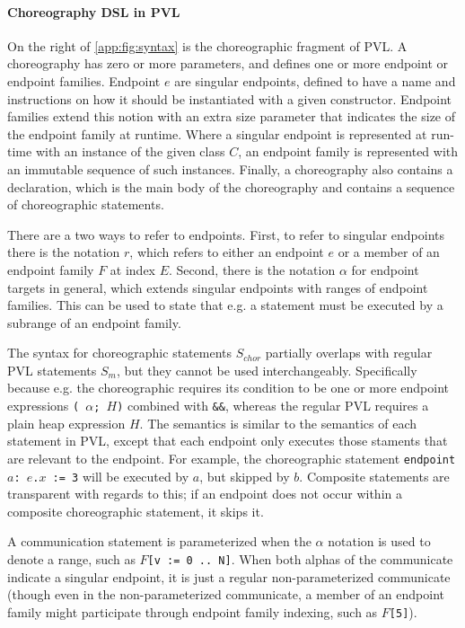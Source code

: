 \paragraph{Choreography DSL in PVL} On the right of \cref{app:fig:syntax} is the choreographic fragment of PVL. A choreography has zero or more parameters, and defines one or more endpoint or endpoint families. Endpoint $e$ are singular endpoints, defined to have a name and instructions on how it should be instantiated with a given constructor. Endpoint families extend this notion with an extra size parameter that indicates the size of the endpoint family at runtime. Where a singular endpoint is represented at run-time with an instance of the given class $C$, an endpoint family is represented with an immutable sequence of such instances. Finally, a choreography also contains a \kwrun{} declaration, which is the main body of the choreography and contains a sequence of choreographic statements.

There are a two ways to refer to endpoints. First, to refer to singular endpoints there is the notation $r$, which refers to either an endpoint $e$ or a member of an endpoint family $F$ at index $E$. Second, there is the notation $\alpha$ for endpoint targets in general, which extends singular endpoints with ranges of endpoint families. This can be used to state that e.g. a statement must be executed by a subrange of an endpoint family.

The syntax for choreographic statements $S_{chor}$ partially overlaps with regular PVL statements $S_m$, but they cannot be used interchangeably. Specifically because e.g. the choreographic \kwif{} requires its condition to be one or more endpoint expressions \texttt{(\kwepexpr{} $\alpha$; $H$)} combined with \texttt{\&\&}, whereas the regular PVL \kwif{} requires a plain heap expression $H$. The semantics is similar to the semantics of each statement in PVL, except that each endpoint only executes those staments that are relevant to the endpoint. For example, the choreographic statement \texttt{endpoint $a$: $e$.$x$ := 3} will be executed by $a$, but skipped by $b$. Composite statements are transparent with regards to this; if an endpoint does not occur within a composite choreographic statement, it skips it.

A communication statement is parameterized when the $\alpha$ notation is used to denote a range, such as \texttt{$F$[v := 0 .. N]}. When both alphas of the communicate indicate a singular endpoint, it is just a regular non-parameterized communicate (though even in the non-parameterized communicate, a member of an endpoint family might participate through endpoint family indexing, such as \texttt{$F$[5]}).

